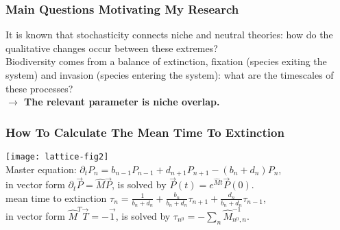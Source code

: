 \documentclass[dvipsnames]{beamer}
\begin{document}
\begin{frame}
\frametitle{Main Questions Motivating My Research}
\pause
\Large{
It is known that stochasticity connects niche and neutral theories: how do the qualitative changes occur between these extremes? \\
\pause
\vspace{0.6cm}
Biodiversity comes from a balance of extinction, fixation (species exiting the system) and invasion (species entering the system): what are the timescales of these processes? \\%
}
\vspace{0.6cm}
\pause
\textbf{$\rightarrow$ The relevant parameter is niche overlap.} 
\end{frame}


\begin{frame}
\frametitle{How To Calculate The Mean Time To Extinction}
\texttt{[image: lattice-fig2]} \\
\vspace{0.8cm}
Master equation: $\partial_t P_n =  b_{n-1}P_{n-1} + d_{n+1}P_{n+1} - (b_n+d_n)P_n$, \\
\vspace{0.2cm}
in vector form $\partial_t \vec{P} = \hat{M}\vec{P}$, is solved by $\vec{P}(t)=e^{\hat{M}t}\vec{P}(0)$. \\
\pause
\vspace{0.8cm}
mean time to extinction $\tau_n = \frac{1}{b_n+d_n} + \frac{b_n}{b_n+d_n}\tau_{n+1} + \frac{d_n}{b_n+d_n}\tau_{n-1}$, \\
\vspace{0.2cm}
in vector form $\hat{M}^T\vec{T}=-\vec{1}$, is solved by $\boxed{\tau_{n^0} = -\sum_n \hat{M}^{-1}_{n^0,n}}$. 
\end{frame}
\end{document}
